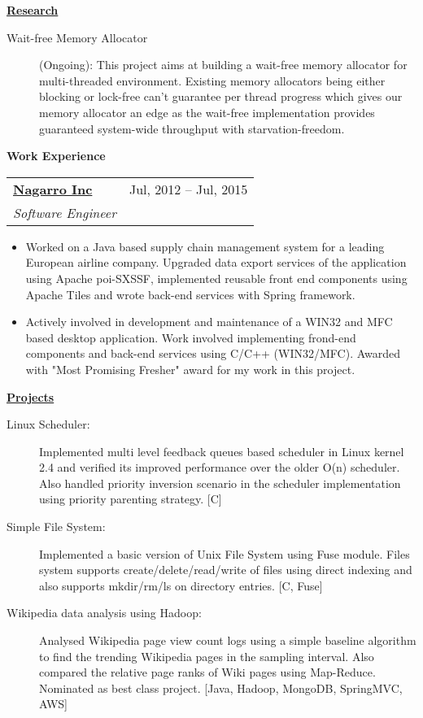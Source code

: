 \documentclass[letterpaper,11pt]{article}
\makeatletter
\newcommand{\resitem}[1]{\item #1 \vspace{2pt}}
\newcommand{\resheading}[1]{{\large \colorbox{mygrey}{\begin{minipage}{\textwidth}{\textbf{#1 \vphantom{p\^{E}}}}\end{minipage}}}\vspace{6pt}}
\newcommand{\ressubheading}[4]{
\begin{tabular*}{7in}{l@{\extracolsep{\fill}}r}
		\textbf{#1} & #2 \\
		\textit{#3} & \textit{#4} \\
\end{tabular*}\vspace{-3pt}}
\makeatother
\begin{document}
\resheading{\href{https://github.com/ashish-17/}{Research}}
\begin{description}
\item[Wait-free Memory Allocator]{\footnotesize(Ongoing): This project aims at building a wait-free memory allocator for multi-threaded environment. Existing memory allocators being either blocking or lock-free can't guarantee per thread progress which gives our memory allocator an edge as the wait-free implementation provides guaranteed system-wide throughput with starvation-freedom.}

\end{description}
\resheading{Work Experience}
			\ressubheading{\href{http://www.nagarro.com/}{Nagarro Inc}}{Jul, 2012 -- Jul, 2015}
				{Software Engineer}{}
				{ \footnotesize
				\begin{itemize}
					\resitem{Worked on a Java based supply chain management system for a leading European airline company. Upgraded data export services  of the application using Apache poi-SXSSF, implemented reusable front end components using Apache Tiles and wrote back-end services with Spring framework.}
					\resitem{Actively involved in development and maintenance of a WIN32 and MFC based desktop application. Work involved implementing frond-end components and back-end services using C/C++ (WIN32/MFC). Awarded with "Most Promising Fresher" award for my work in this project.}
							\end{itemize}
				}			


\resheading{\href{http://www.ashish-jindal.com/}{Projects}}

\begin{description}
\item[Linux Scheduler:] { \footnotesize Implemented multi level feedback queues based scheduler in Linux kernel 2.4 and verified its improved performance over the older O(n) scheduler. Also handled priority inversion scenario in the scheduler implementation using priority parenting strategy. [C]}

\item[Simple File System:] { \footnotesize Implemented a basic version of Unix File System using Fuse module. Files system supports create/delete/read/write of files using direct indexing and also supports mkdir/rm/ls on directory entries. [C, Fuse]}

\item[Wikipedia data analysis using Hadoop:] { \footnotesize Analysed Wikipedia page view count logs using a simple baseline algorithm to find the trending Wikipedia pages in the sampling interval. Also compared the relative page ranks of Wiki pages using Map-Reduce. Nominated as best class project. [Java, Hadoop, MongoDB, SpringMVC, AWS]}

\end{description}
\end{document}
